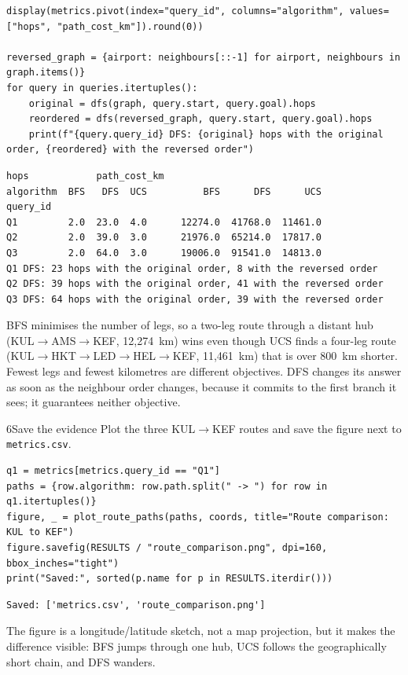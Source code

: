 \begin{labanswer}
\begin{lstlisting}[style=utppython]
display(metrics.pivot(index="query_id", columns="algorithm", values=["hops", "path_cost_km"]).round(0))

reversed_graph = {airport: neighbours[::-1] for airport, neighbours in graph.items()}
for query in queries.itertuples():
    original = dfs(graph, query.start, query.goal).hops
    reordered = dfs(reversed_graph, query.start, query.goal).hops
    print(f"{query.query_id} DFS: {original} hops with the original order, {reordered} with the reversed order")
\end{lstlisting}
\expectedoutput
\begin{lstlisting}[style=utpterminal]
          hops            path_cost_km
algorithm  BFS   DFS  UCS          BFS      DFS      UCS
query_id
Q1         2.0  23.0  4.0      12274.0  41768.0  11461.0
Q2         2.0  39.0  3.0      21976.0  65214.0  17817.0
Q3         2.0  64.0  3.0      19006.0  91541.0  14813.0
Q1 DFS: 23 hops with the original order, 8 with the reversed order
Q2 DFS: 39 hops with the original order, 41 with the reversed order
Q3 DFS: 64 hops with the original order, 39 with the reversed order
\end{lstlisting}
BFS minimises the number of legs, so a two-leg route through a distant hub (KUL$\to$AMS$\to$KEF, 12,274~km) wins even though UCS finds a four-leg route (KUL$\to$HKT$\to$LED$\to$HEL$\to$KEF, 11,461~km) that is over 800~km shorter. Fewest legs and fewest kilometres are different objectives. DFS changes its answer as soon as the neighbour order changes, because it commits to the first branch it sees; it guarantees neither objective.
\end{labanswer}

\begin{labquestion}{6}{Save the evidence}
Plot the three KUL$\to$KEF routes and save the figure next to \texttt{metrics.csv}.
\end{labquestion}

\begin{labanswer}
\begin{lstlisting}[style=utppython]
q1 = metrics[metrics.query_id == "Q1"]
paths = {row.algorithm: row.path.split(" -> ") for row in q1.itertuples()}
figure, _ = plot_route_paths(paths, coords, title="Route comparison: KUL to KEF")
figure.savefig(RESULTS / "route_comparison.png", dpi=160, bbox_inches="tight")
print("Saved:", sorted(p.name for p in RESULTS.iterdir()))
\end{lstlisting}
\expectedoutput
\begin{lstlisting}[style=utpterminal]
Saved: ['metrics.csv', 'route_comparison.png']
\end{lstlisting}
The figure is a longitude/latitude sketch, not a map projection, but it makes the difference visible: BFS jumps through one hub, UCS follows the geographically short chain, and DFS wanders.
\end{labanswer}

